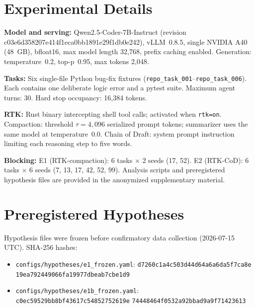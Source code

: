 \documentclass{article}
\newif\ifanon\anontrue
\begin{document}
\section{Experimental Details}
\label{app:experimental}

\textbf{Model and serving:} Qwen2.5-Coder-7B-Instruct (revision c03e6d358207e414f1eca0bb1891e29f1db0e242), vLLM~0.8.5, single NVIDIA A40 (48~GB), bfloat16, max model length 32{,}768, prefix caching enabled. Generation: temperature~0.2, top-p~0.95, max tokens 2{,}048.

\textbf{Tasks:} Six single-file Python bug-fix fixtures (\texttt{repo\_task\_001}--\texttt{repo\_task\_006}). Each contains one deliberate logic error and a pytest suite. Maximum agent turns: 30. Hard stop occupancy: 16{,}384 tokens.

\textbf{RTK:} Rust binary intercepting shell tool calls; activated when \texttt{rtk=on}. Compaction: threshold $\tau=4{,}096$ serialized prompt tokens; summarizer uses the same model at temperature~0.0. Chain of Draft: system prompt instruction limiting each reasoning step to five words.

\textbf{Blocking:} E1 (RTK-compaction): 6 tasks $\times$ 2 seeds (17, 52). E2 (RTK-CoD): 6 tasks $\times$ 6 seeds (7, 13, 17, 42, 52, 99). Analysis scripts and preregistered hypothesis files are provided in the \ifanon anonymized supplementary material\else reproducibility archive~\citep{cab_dataset2026}\fi.

\section{Preregistered Hypotheses}
\label{app:prereg}

Hypothesis files were frozen before confirmatory data collection (2026-07-15 UTC). SHA-256 hashes:

\begin{itemize}
\item \texttt{configs/hypotheses/e1\_frozen.yaml}:\newline
{\small\texttt{d7260c1a4c503d44d64a6a6da5f7ca8e}}\newline
{\small\texttt{19ea792449066fa19977dbeab7cbe1d9}}
\item \texttt{configs/hypotheses/e1b\_frozen.yaml}:\newline
{\small\texttt{c0ec59529bb8bf43617c54852752619e}}\newline
{\small\texttt{74448464f0532a92bbad9a9f71423613}}
\end{itemize}
\end{document}
